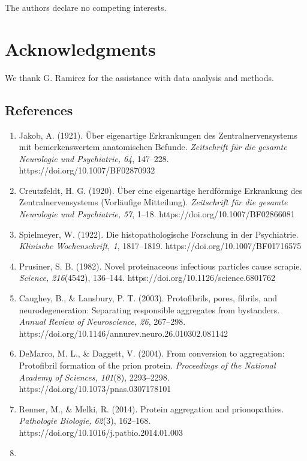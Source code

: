 \documentclass[
  twocolumn]{biophys-new-mod}
\begin{document}
The authors declare no competing interests.

\section{Acknowledgments}\label{acknowledgments}

We thank G. Ramirez for the assistance with data analysis and methods.

\subsection{References}\label{references}

\begin{enumerate}
\def\labelenumi{\arabic{enumi}.}
\item
  Jakob, A. (1921). Über eigenartige Erkrankungen des
  Zentralnervensystems mit bemerkenswertem anatomischen Befunde.
  \emph{Zeitschrift für die gesamte Neurologie und Psychiatrie, 64},
  147--228. https://doi.org/10.1007/BF02870932
\item
  Creutzfeldt, H. G. (1920). Über eine eigenartige herdförmige
  Erkrankung des Zentralnervensystems (Vorläufige Mitteilung).
  \emph{Zeitschrift für die gesamte Neurologie und Psychiatrie, 57},
  1--18. https://doi.org/10.1007/BF02866081
\item
  Spielmeyer, W. (1922). Die histopathologische Forschung in der
  Psychiatrie. \emph{Klinische Wochenschrift, 1}, 1817--1819.
  https://doi.org/10.1007/BF01716575
\item
  Prusiner, S. B. (1982). Novel proteinaceous infectious particles cause
  scrapie. \emph{Science, 216}(4542), 136--144.
  https://doi.org/10.1126/science.6801762
\item
  Caughey, B., \& Lansbury, P. T. (2003). Protofibrils, pores, fibrils,
  and neurodegeneration: Separating responsible aggregates from
  bystanders. \emph{Annual Review of Neuroscience, 26}, 267--298.
  https://doi.org/10.1146/annurev.neuro.26.010302.081142
\item
  DeMarco, M. L., \& Daggett, V. (2004). From conversion to aggregation:
  Protofibril formation of the prion protein. \emph{Proceedings of the
  National Academy of Sciences, 101}(8), 2293--2298.
  https://doi.org/10.1073/pnas.0307178101
\item
  Renner, M., \& Melki, R. (2014). Protein aggregation and
  prionopathies. \emph{Pathologie Biologie, 62}(3), 162--168.
  https://doi.org/10.1016/j.patbio.2014.01.003
\item

\end{enumerate}
\end{document}

